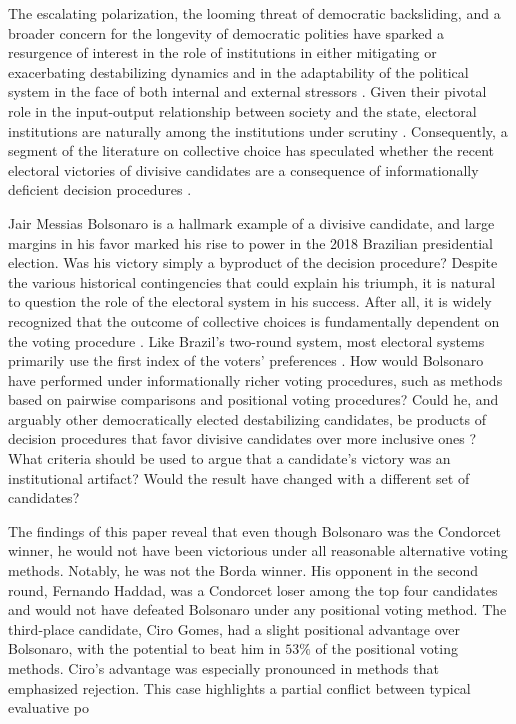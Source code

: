 \documentclass[hidelinks,11pt]{article} \usepackage[utf8]{inputenc}
\begin{document}
The escalating polarization, the looming threat of democratic backsliding, and a broader concern for the longevity of democratic polities have sparked a resurgence of interest in the role of institutions in either mitigating or exacerbating destabilizing dynamics and in the adaptability of the political system in the face of both internal and external stressors \parencite{Bednare2113843118, chiopris2021wolf, ostrom1997meaning}. Given their pivotal role in the input-output relationship between society and the state, electoral institutions are naturally among the institutions under scrutiny \parencite{Wange2021systems}. Consequently, a segment of the literature on collective choice has speculated whether the recent electoral victories of divisive candidates are a consequence of informationally deficient decision procedures \parencite{potthoff2021condorcet, kurrild2018trump, woon2020trump}.

Jair Messias Bolsonaro is a hallmark example of a divisive candidate, and large margins in his favor marked his rise to power in the 2018 Brazilian presidential election. Was his victory simply a byproduct of the decision procedure? Despite the various historical contingencies that could explain his triumph, it is natural to question the role of the electoral system in his success. After all, it is widely recognized that the outcome of collective choices is fundamentally dependent on the voting procedure \parencite{riker1982liberalism}. Like Brazil's two-round system, most electoral systems primarily use the first index of the voters' preferences \parencite{grofman04_if_you_like_alter_vote}. How would Bolsonaro have performed under informationally richer voting procedures, such as methods based on pairwise comparisons and positional voting procedures? Could he, and arguably other democratically elected destabilizing candidates, be products of decision procedures that favor divisive candidates over more inclusive ones \parencite{igersheim22_compar_votin_method}? What criteria should be used to argue that a candidate's victory was an institutional artifact? Would the result have changed with a different set of candidates?

The findings of this paper reveal that even though Bolsonaro was the Condorcet winner, he would not have been victorious under all reasonable alternative voting methods. Notably, he was not the Borda winner. His opponent in the second round, Fernando Haddad, was a Condorcet loser among the top four candidates and would not have defeated Bolsonaro under any positional voting method. The third-place candidate, Ciro Gomes, had a slight positional advantage over Bolsonaro, with the potential to beat him in \(53\%\) of the positional voting methods. Ciro's advantage was especially pronounced in methods that emphasized rejection. This case highlights a partial conflict between typical evaluative po
\end{document}
